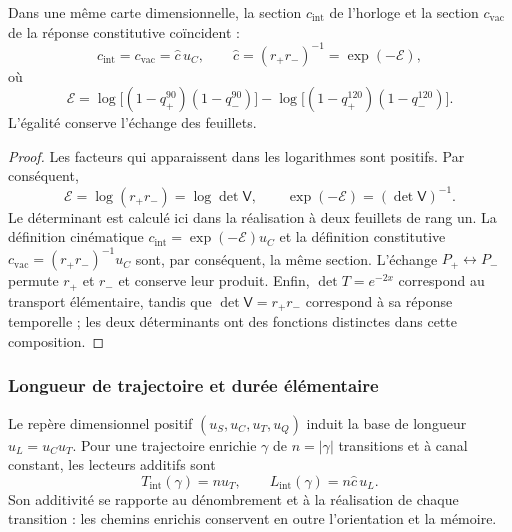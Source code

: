 \begin{proposition}
\label{v:v:prop:identidad-velocidad}
Dans une même carte dimensionnelle, la section $c_{\mathrm{int}}$ de l’horloge
et la section $c_{\mathrm{vac}}$ de la réponse constitutive coïncident :
\begin{equation}
 c_{\mathrm{int}}=c_{\mathrm{vac}}
   =\widehat c\,u_C,
 \qquad
 \widehat c=(r_+r_-)^{-1}
            =\exp(-\mathcal E),
 \label{v:v:eq:identidad-velocidad}
\end{equation}
où
\begin{equation}
 \mathcal E=
 \log\!\bigl[(1-q_+^{90})(1-q_-^{90})\bigr]
 -\log\!\bigl[(1-q_+^{120})(1-q_-^{120})\bigr].
 \label{v:v:eq:velocidad-lector-simetrico}
\end{equation}
L’égalité conserve l’échange des feuillets.
\end{proposition}
\begin{proof}
Les facteurs qui apparaissent dans les logarithmes sont positifs. Par conséquent,
\[
 \mathcal E=\log(r_+r_-)
            =\log\det\mathsf V,
 \qquad \exp(-\mathcal E)=(\det\mathsf V)^{-1}.
\]
Le déterminant est calculé ici dans la réalisation à deux feuillets de rang
un. La définition cinématique $c_{\mathrm{int}}=\exp(-\mathcal E)u_C$
et la définition constitutive $c_{\mathrm{vac}}=(r_+r_-)^{-1}u_C$
sont, par conséquent, la même section. L’échange $P_+\leftrightarrow
P_-$ permute $r_+$ et $r_-$ et conserve leur produit. Enfin,
$\det T=e^{-2x}$ correspond au transport élémentaire, tandis que
$\det\mathsf V=r_+r_-$ correspond à sa réponse temporelle ; les deux
déterminants ont des fonctions distinctes dans cette composition.
\end{proof}

\subsubsection{Longueur de trajectoire et durée élémentaire}

Le repère dimensionnel positif $(u_S,u_C,u_T,u_Q)$ induit la base de longueur $u_L=u_Cu_T$. Pour une trajectoire enrichie $\gamma$ de $n=|\gamma|$ transitions et à canal constant, les lecteurs additifs sont
\begin{equation}
 T_{\mathrm{int}}(\gamma)=n u_T,
 \qquad L_{\mathrm{int}}(\gamma)=n\widehat c\,u_L.
 \label{v:v:eq:velocidad-longitud-reloj}
\end{equation}
Son additivité se rapporte au dénombrement et à la réalisation de chaque transition :
les chemins enrichis conservent en outre l’orientation et la mémoire.

